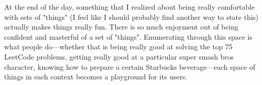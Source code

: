 \documentclass[12pt]{article}
\theoremstyle{definition} %
\theoremstyle{plain} %
\begin{document}
At the end of the day, something that I realized about being really comfortable with sets of "things" (I feel like I should probably find another way to state this) actually makes things really fun. There is so much enjoyment out of being confident and masterful of a set of "things". Enumerating through this space is what people do—whether that is being really good at solving the top 75 LeetCode problems, getting really good at a particular super smash bros character, knowing how to prepare a certain Starbucks beverage—each space of things in each context becomes a playground for its users. 
\end{document}
